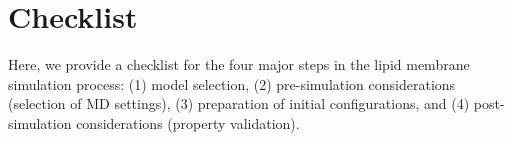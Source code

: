 \documentclass[9pt,bestpractices]{livecoms}
\begin{document}
\section{Checklist}
\label{sec:checklist}
Here, we provide a checklist for the four major steps in the lipid membrane simulation process: (1) model selection, (2) pre-simulation considerations (selection of MD settings), (3) preparation of initial configurations, and (4) post-simulation considerations (property validation).
\end{document}
